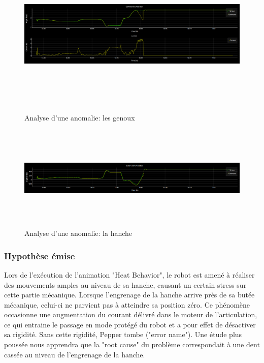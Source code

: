 \begin{figure}[h]
	\centering\includegraphics[height=8cm,width=15cm]{images/analyse_2.png}
	\caption{Analyse d'une anomalie: les genoux}
	\label{fig:analyse d'une anomalie: kneePitch}
\end{figure}

\begin{figure}[h]
	\centering\includegraphics[height=5cm,width=15cm]{images/analyse_3.png}
	\caption{Analyse d'une anomalie: la hanche}
	\label{fig:analyse d'une anomalie: hipitch}
\end{figure}

\subsubsection{Hypothèse émise}
 Lors de l'exécution de l'animation "Heat Behavior", le robot est amené à réaliser des mouvements amples au niveau de sa hanche, causant un certain stress sur cette partie mécanique. Lorsque l'engrenage de la hanche arrive près de sa butée mécanique, celui-ci ne parvient pas à atteindre sa position zéro. Ce phénomène occasionne une augmentation du courant délivré dans le moteur de l'articulation, ce qui entraine le passage en mode protégé du robot et a pour effet de désactiver sa rigidité. Sans cette rigidité, Pepper tombe ("error name"). Une étude plus poussée nous apprendra que la "root cause" du problème correspondait à une dent cassée au niveau de l'engrenage de la hanche. 


